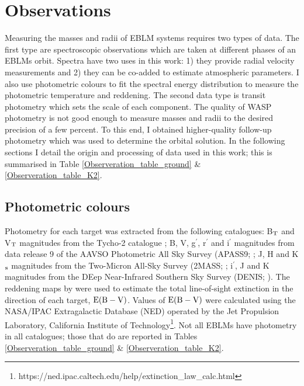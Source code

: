 \chapter{Observations}




Measuring the masses and radii of EBLM systems requires two types of data. The first type are spectroscopic observations which are taken at different phases of an EBLMs orbit. Spectra have two uses in this work: 1) they provide radial velocity measurements and 2) they can be co-added to estimate atmospheric parameters. I also use photometric colours to fit the spectral energy distribution to measure the photometric temperature and reddening. The second data type is transit photometry which sets the scale of each component. The quality of WASP photometry is not good enough to measure masses and radii to the desired precision of a few percent. To this end, I obtained higher-quality follow-up photometry which was used to determine the orbital solution. In the following sections I detail the origin and processing of data used in this work; this is summarised in Table \ref{Observeration_table_ground} \& \ref{Observeration_table_K2}. 



\section{Photometric colours}

Photometry for each target was extracted from the following catalogues: B$_{\rm T}$ and V$_{\rm T}$ magnitudes from the Tycho-2 catalogue \citep{2000A26A...355L..27H}; B, V, g$^{\prime}$, r$^{\prime}$ and i$^{\prime}$ magnitudes from data release 9 of the AAVSO Photometric All Sky Survey (APASS9; \citealt{2016yCat.2336....0H}; J, H and K$_{\rm s}$ magnitudes from the Two-Micron All-Sky Survey (2MASS; \citealt{2006AJ....131.1163S}; i$^{\prime}$, J and K magnitudes from the DEep Near-Infrared Southern Sky Survey (DENIS; \citealt{1997Msngr..87...27E}). The reddening maps by \citet{2011ApJ...737..103S} were used to estimate the total line-of-sight extinction in the direction of each target, ${\rm E}({\rm B}-{\rm V})$. Values of ${\rm E}({\rm B}-{\rm V})$ were calculated using the NASA/IPAC Extragalactic Database (NED) operated by the Jet Propulsion Laboratory, California Institute of Technology\footnote{https://ned.ipac.caltech.edu/help/extinction\_law\_calc.html}. Not all EBLMs have photometry in all catalogues; those that do are reported in Tables \ref{Observeration_table_ground} \& \ref{Observeration_table_K2}.

